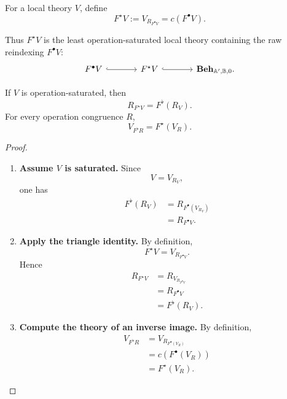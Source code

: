 \begin{definition}
\label{def:to-Fstar}
    For a local theory \(V\), define
    \[
        F^\star V
        :=
        V_{R_{F^\bullet V}}
        =
        c(F^\bullet V).
    \]
\end{definition}

Thus \(F^\star V\) is the least operation-saturated local theory containing
the raw reindexing \(F^\bullet V\):
\[
\begin{tikzcd}[column sep=large]
    F^\bullet V
        \arrow[r, hook]
    &
    F^\star V
        \arrow[r, hook]
    &
    \mathbf{Beh}_{\mathbb A',\mathbb B,0}.
\end{tikzcd}
\]

\begin{proposition}
\label{prop:to-Fstar-Fflat-compatibility}
    If \(V\) is operation-saturated, then
    \[
        R_{F^\star V}
        =
        F^\flat(R_V).
    \]
    For every operation congruence \(R\),
    \[
        V_{F^\flat R}
        =
        F^\star(V_R).
    \]
\end{proposition}

\begin{proof}
    \leavevmode
    \begin{enumerate}
        \item \textbf{Assume \(V\) is saturated.}
        Since
        \[
            V=V_{R_V},
        \]
        one has
        \[
        \begin{aligned}
            F^\flat(R_V)
            &=
            R_{F^\bullet(V_{R_V})}
            \\
            &=
            R_{F^\bullet V}.
        \end{aligned}
        \]

        \item \textbf{Apply the triangle identity.}
        By definition,
        \[
            F^\star V
            =
            V_{R_{F^\bullet V}}.
        \]
        Hence
        \[
        \begin{aligned}
            R_{F^\star V}
            &=
            R_{V_{R_{F^\bullet V}}}
            \\
            &=
            R_{F^\bullet V}
            \\
            &=
            F^\flat(R_V).
        \end{aligned}
        \]

        \item \textbf{Compute the theory of an inverse image.}
        By definition,
        \[
        \begin{aligned}
            V_{F^\flat R}
            &=
            V_{R_{F^\bullet(V_R)}}
            \\
            &=
            c(F^\bullet(V_R))
            \\
            &=
            F^\star(V_R).
        \end{aligned}
        \]
    \end{enumerate}
\end{proof}

